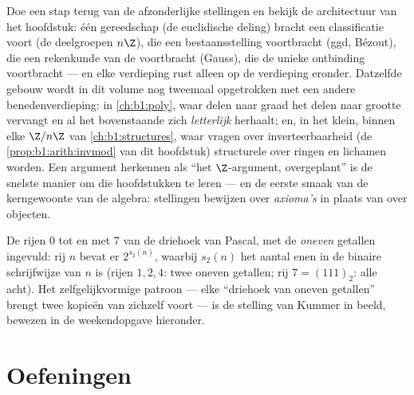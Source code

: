 \begin{remark}\label{rem:b1:arith:interlude}
Doe een stap terug van de afzonderlijke stellingen en bekijk de
architectuur van het hoofdstuk: één gereedschap (de euclidische deling)
bracht een classificatie voort (de deelgroepen $n\Z$), die een
bestaansstelling voortbracht (ggd, Bézout), die een rekenkunde van de
 voortbracht (Gauss), die de unieke ontbinding voortbracht
--- en elke verdieping rust alleen op de verdieping eronder. Datzelfde
gebouw wordt in dit volume nog tweemaal opgetrokken met een andere
benedenverdieping: in \cref{ch:b1:poly}, waar delen naar graad het delen
naar grootte vervangt en al het bovenstaande zich \emph{letterlijk}
herhaalt; en, in het klein, binnen elke $\Z/n\Z$ van
\cref{ch:b1:structures}, waar vragen over inverteerbaarheid (de
\cref{prop:b1:arith:invmod} van dit hoofdstuk) structurele  over
ringen en lichamen worden. Een argument herkennen als ``het
$\Z$-argument, overgeplant'' is de snelste manier om die hoofdstukken te
leren --- en de eerste smaak van de kerngewoonte van de algebra: stellingen
bewijzen over \emph{axioma's} in plaats van over objecten.
\end{remark}

\begin{omfigure}

{\small De rijen $0$ tot en met $7$ van de driehoek van Pascal, met de
\emph{oneven} getallen ingevuld: rij $n$ bevat er $2^{s_2(n)}$, waarbij
$s_2(n)$ het aantal enen in de binaire schrijfwijze van $n$ is (rijen
$1, 2, 4$: twee oneven getallen; rij $7 = (111)_2$: alle acht). Het
zelfgelijkvormige patroon --- elke ``driehoek van oneven getallen''
brengt twee kopieën van zichzelf voort --- is de stelling van Kummer in
beeld, bewezen in de weekendopgave hieronder.}
\end{omfigure}

\section{Oefeningen}

